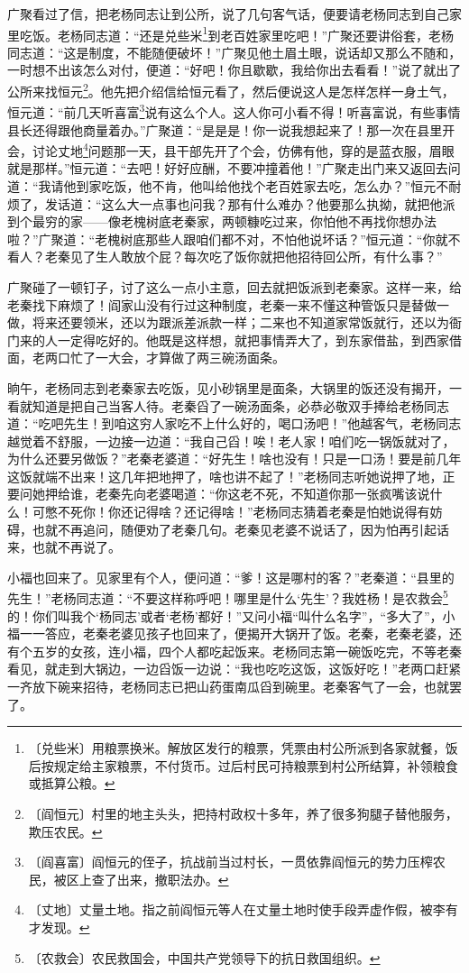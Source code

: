\documentclass[12pt,UTF-8,openany]{ctexbook}
\begin{document}
\begin{large}
    广聚看过了信，把老杨同志让到公所，说了几句客气话，便要请老杨同志到自己家里吃饭。老杨同志道：“还是兑些米\footnote{〔兑些米〕用粮票换米。解放区发行的粮票，凭票由村公所派到各家就餐，饭后按规定给主家粮票，不付货币。过后村民可持粮票到村公所结算，补领粮食或抵算公粮。}到老百姓家里吃吧！”广聚还要讲俗套，老杨同志道：“这是制度，不能随便破坏！”广聚见他土眉土眼，说话却又那么不随和，一时想不出该怎么对付，便道：“好吧！你且歇歇，我给你出去看看！”说了就出了公所来找恒元\footnote{〔阎恒元〕村里的地主头头，把持村政权十多年，养了很多狗腿子替他服务，欺压农民。}。他先把介绍信给恒元看了，然后便说这人是怎样怎样一身土气，恒元道：“前几天听喜富\footnote{〔阎喜富〕阎恒元的侄子，抗战前当过村长，一贯依靠阎恒元的势力压榨农民，被区上查了出来，撤职法办。}说有这么个人。这人你可小看不得！听喜富说，有些事情县长还得跟他商量着办。”广聚道：“是是是！你一说我想起来了！那一次在县里开会，讨论丈地\footnote{〔丈地〕丈量土地。指之前阎恒元等人在丈量土地时使手段弄虚作假，被李有才发现。}问题那一天，县干部先开了个会，仿佛有他，穿的是蓝衣服，眉眼就是那样。”恒元道：“去吧！好好应酬，不要冲撞着他！”广聚走出门来又返回去问道：“我请他到家吃饭，他不肯，他叫给他找个老百姓家去吃，怎么办？”恒元不耐烦了，发话道：“这么大一点事也问我？那有什么难办？他要那么执拗，就把他派到个最穷的家——像老槐树底老秦家，两顿糠吃过来，你怕他不再找你想办法啦？”广聚道：“老槐树底那些人跟咱们都不对，不怕他说坏话？”恒元道：“你就不看人？老秦见了生人敢放个屁？每次吃了饭你就把他招待回公所，有什么事？”
    
    广聚碰了一顿钉子，讨了这么一点小主意，回去就把饭派到老秦家。这样一来，给老秦找下麻烦了！阎家山没有行过这种制度，老秦一来不懂这种管饭只是替做一做，将来还要领米，还以为跟派差派款一样；二来也不知道家常饭就行，还以为衙门来的人一定得吃好的。他既是这样想，就把事情弄大了，到东家借盐，到西家借面，老两口忙了一大会，才算做了两三碗汤面条。
    
    晌午，老杨同志到老秦家去吃饭，见小砂锅里是面条，大锅里的饭还没有揭开，一看就知道是把自己当客人待。老秦舀了一碗汤面条，必恭必敬双手捧给老杨同志道：“吃吧先生！到咱这穷人家吃不上什么好的，喝口汤吧！”他越客气，老杨同志越觉着不舒服，一边接一边道：“我自己舀！唉！老人家！咱们吃一锅饭就对了，为什么还要另做饭？”老秦老婆道：“好先生！啥也没有！只是一口汤！要是前几年这饭就端不出来！这几年把地押了，啥也讲不起了！”老杨同志听她说押了地，正要问她押给谁，老秦先向老婆喝道：“你这老不死，不知道你那一张疯嘴该说什么！可憋不死你！你还记得啥？还记得啥！”老杨同志猜着老秦是怕她说得有妨碍，也就不再追问，随便劝了老秦几句。老秦见老婆不说话了，因为怕再引起话来，也就不再说了。
    
    小福也回来了。见家里有个人，便问道：“爹！这是哪村的客？”老秦道：“县里的先生！”老杨同志道：“不要这样称呼吧！哪里是什么‘先生’？我姓杨！是农救会\footnote{〔农救会〕农民救国会，中国共产党领导下的抗日救国组织。}的！你们叫我个‘杨同志’或者‘老杨’都好！”又问小福“叫什么名字”，“多大了”，小福一一答应，老秦老婆见孩子也回来了，便揭开大锅开了饭。老秦，老秦老婆，还有个五岁的女孩，连小福，四个人都吃起饭来。老杨同志第一碗饭吃完，不等老秦看见，就走到大锅边，一边舀饭一边说：“我也吃吃这饭，这饭好吃！”老两口赶紧一齐放下碗来招待，老杨同志已把山药蛋南瓜舀到碗里。老秦客气了一会，也就罢了。
    

\end{large}
\end{document}
